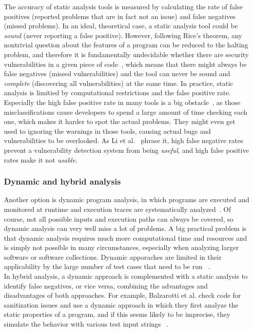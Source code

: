 \documentclass[
a4paper,
pagesize,
pdftex,
12pt,
twoside, %
BCOR=5mm, %
ngerman,
fleqn,
final,
]{scrartcl}
\begin{document}
	The accuracy of static analysis tools is measured by calculating the rate of false positives (reported problems that are in fact not an issue) and false negatives (missed problems). In an ideal, theoretical case, a static analysis tool could be \textit{sound} (never reporting a false positive). However, following Rice's theorem, any nontrivial question about the features of a program can be reduced to the halting problem, and therefore it is fundamentally undecidable whether there are security vulnerabilities in a given piece of code~\cite{Chess.2004}, which means that there might always be false negatives (missed vulnerabilities) and the tool can never be sound and \textit{complete} (discovering all vulnerabilities) at the same time. In practice, static analysis is limitied by computational restrictions and the false positive rate. Especially the high false positive rate in many tools is a big obstacle~\cite{Liu.2018}, as those misclassifications cause developers to spend a large amount of time checking each one, which makes it harder to spot the actual problems. They might even get used to ignoring the warnings in those tools, causing actual bugs and vulnerabilities to be overlooked. As Li et al.~\cite{Li.2005} phrase it, high false negative rates prevent a vulnerability detection system from being \textit{useful}, and high false positive rates make it not \textit{usable}.\\
	
	\subsubsection{Dynamic and hybrid analysis}
	Another option is dynamic program analysis, in which programs are executed and monitored at runtime and execution traces are systematically analyzed~\cite{Shar.2013c}. Of course, not all possible inputs and execution paths can always be covered, so dynamic analysis can very well miss a lot of problems. A big practical problem is that dynamic analysis requires much more computational time and resources and is simply not possible in many circumstances, especially when analyzing larger software or software collections. Dynamic apporaches are limited in their applicability by the large number of test cases that need to be run ~\cite{Aggarwal.2006}.\\
	In hybrid analysis, a dynamic approach is complemented with a static analysis to identify false negatives, or vice versa, combining the advantages and disadvantages of both approaches. For example, Balzarotti et al. check code for sanitization issues and use a dynamic approach in which they first analyze the static properties of a program, and if this seems likely to be imprecise, they simulate the behavior with various test input strings ~\cite{Balzarotti.2008}. 
	
\end{document}
